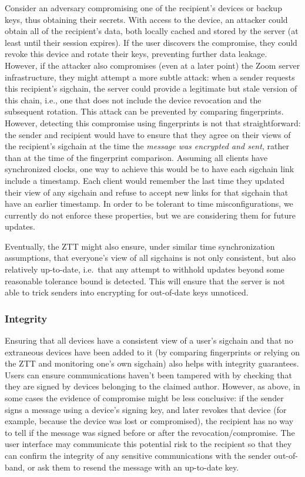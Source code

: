 Consider an adversary compromising one of the recipient's devices or backup keys, thus obtaining their
secrets. With access to the device, an attacker could obtain all of the recipient's data, both locally cached
and stored by the server (at least until their session expires). If the user discovers the
compromise, they could revoke this device and rotate their keys, preventing further data leakage.
However, if the attacker also compromises (even at a later point) the Zoom server infrastructure,
they might attempt a more subtle attack: when a sender requests this recipient's sigchain, the
server could provide a legitimate but stale version of this chain, i.e., one that does not include
the device revocation and the subsequent rotation. This attack can be prevented by
comparing fingerprints. However, detecting this compromise using fingerprints is not that
straightforward: the sender and recipient would have to ensure that they agree on their views of the recipient's sigchain at the time the \emph{message was encrypted and sent}, rather than at the time of the
fingerprint comparison. Assuming all clients have synchronized clocks, one way to achieve this would be
to have each sigchain link include a timestamp. Each client would remember the last time
they updated their view of any sigchain and refuse to accept new links for that sigchain that have an
earlier timestamp. In order to be tolerant to time misconfigurations, we currently do not enforce
these properties, but we are considering them for future updates.

Eventually, the ZTT might also ensure, under similar time synchronization assumptions, that
everyone's view of all sigchains is not only consistent, but also relatively up-to-date, i.e.\ that
any attempt to withhold updates beyond some reasonable tolerance bound is detected. This will ensure
that the server is not able to trick senders into encrypting for out-of-date keys unnoticed.

\subsubsection{Integrity}
Ensuring that all devices have a consistent view of a user's sigchain and that no
extraneous devices have been added to it (by comparing fingerprints or
relying on the ZTT and monitoring one's own sigchain) also helps with integrity
guarantees. Users can ensure communications haven't been tampered with by
checking that they are signed by devices belonging to the claimed author. However, as above, in some
cases the evidence of compromise might be less conclusive: if the sender signs a message using a
device's signing key, and later revokes that device (for example, because the device was lost or
compromised), the recipient has no way to tell if the message was signed before or after the
revocation/compromise. The user interface may communicate this potential risk to the recipient so
that they can confirm the integrity of any sensitive communications with the sender out-of-band, or
ask them to resend the message with an up-to-date key.

